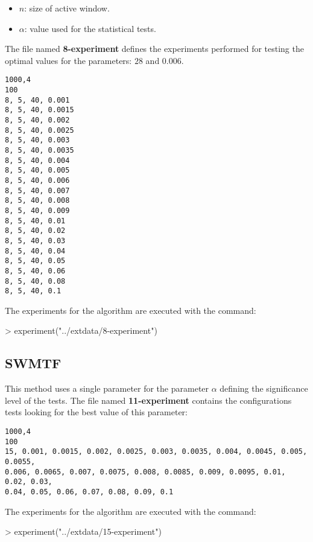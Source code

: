 \documentclass{article}
\begin{document}
\begin{itemize}
\item $n$: size of active window.
\item $\alpha$: value used for the statistical tests.
\end{itemize}

The file named \textbf{8-experiment} defines the experiments performed for
testing the optimal values for the parameters: $28$ and $0.006$.

\begin{verbatim}
1000,4
100
8, 5, 40, 0.001
8, 5, 40, 0.0015
8, 5, 40, 0.002
8, 5, 40, 0.0025
8, 5, 40, 0.003
8, 5, 40, 0.0035
8, 5, 40, 0.004
8, 5, 40, 0.005
8, 5, 40, 0.006
8, 5, 40, 0.007
8, 5, 40, 0.008
8, 5, 40, 0.009
8, 5, 40, 0.01
8, 5, 40, 0.02
8, 5, 40, 0.03
8, 5, 40, 0.04
8, 5, 40, 0.05
8, 5, 40, 0.06
8, 5, 40, 0.08
8, 5, 40, 0.1
\end{verbatim}

The experiments for the algorithm are executed with the command:

\begin{Schunk}
\begin{Sinput}
> experiment("../extdata/8-experiment")
\end{Sinput}
\end{Schunk}

\subsection{SWMTF}

This method uses a single parameter for the parameter $\alpha$ defining the significance
level of the tests. The file named \textbf{11-experiment} contains the configurations
tests looking for the best value of this parameter:

\begin{verbatim}
1000,4
100
15, 0.001, 0.0015, 0.002, 0.0025, 0.003, 0.0035, 0.004, 0.0045, 0.005, 0.0055,
0.006, 0.0065, 0.007, 0.0075, 0.008, 0.0085, 0.009, 0.0095, 0.01, 0.02, 0.03,
0.04, 0.05, 0.06, 0.07, 0.08, 0.09, 0.1
\end{verbatim}

The experiments for the algorithm are executed with the command:

\begin{Schunk}
\begin{Sinput}
> experiment("../extdata/15-experiment")
\end{Sinput}
\end{Schunk}
\end{document}
